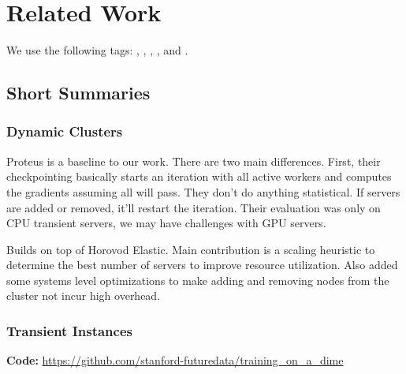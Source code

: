 \chapter{Related Work}
\label{ch:related work}

We use the following tags: \tagdynamic{}, \tagtransient{},
\tagmodelparallelism{}, \tagdataparallelism{}, and \tagoptimizer{}.

\section{Short Summaries}

\subsection{Dynamic Clusters}


\noindent \tagdynamic{} \tagdataparallelism{}

Proteus is a baseline to our work.
There are two main differences.
First, their checkpointing basically starts an iteration with all active workers
and computes the gradients assuming all will pass.
They don't do anything statistical.
If servers are added or removed, it'll restart the iteration.
Their evaluation was only on CPU transient servers, we may have challenges with
GPU servers.


\noindent \tagdynamic{} \tagdataparallelism{}
Builds on top of Horovod Elastic.
Main contribution is a scaling heuristic to determine the best number of
servers to improve resource utilization.
Also added some systems level optimizations to make adding and removing nodes
from the cluster not incur high overhead.



\noindent \tagdynamic{}

\subsection{Transient Instances}


\noindent \tagdynamic{} \tagdataparallelism{}

\noindent \textbf{Code:} \url{https://github.com/stanford-futuredata/training_on_a_dime}

